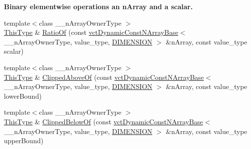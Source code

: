 \begin{Indent}{\bf Binary elementwise operations an n\+Array and a scalar.}
\begin{DoxyCompactItemize}
\item 
{\footnotesize template$<$class \+\_\+\+\_\+n\+Array\+Owner\+Type $>$ }\\\hyperlink{classvct_dynamic_const_n_array_base_a5123caffcf1455a1b99003877eade897}{This\+Type} \& \hyperlink{classvct_dynamic_n_array_base_a7476af6329eb35272605fbe6c8b6dd2d}{Ratio\+Of} (const \hyperlink{classvct_dynamic_const_n_array_base}{vct\+Dynamic\+Const\+N\+Array\+Base}$<$ \+\_\+\+\_\+n\+Array\+Owner\+Type, value\+\_\+type, \hyperlink{classvct_dynamic_n_array_base_aa66532d28588bdf26d08fb593db815d6abfcde386ec801b212d7c42d63a4f3837}{D\+I\+M\+E\+N\+S\+I\+O\+N} $>$ \&n\+Array, const value\+\_\+type scalar)
\item 
{\footnotesize template$<$class \+\_\+\+\_\+n\+Array\+Owner\+Type $>$ }\\\hyperlink{classvct_dynamic_const_n_array_base_a5123caffcf1455a1b99003877eade897}{This\+Type} \& \hyperlink{classvct_dynamic_n_array_base_a0426afa76b231d9774198cbca3cb1c1c}{Clipped\+Above\+Of} (const \hyperlink{classvct_dynamic_const_n_array_base}{vct\+Dynamic\+Const\+N\+Array\+Base}$<$ \+\_\+\+\_\+n\+Array\+Owner\+Type, value\+\_\+type, \hyperlink{classvct_dynamic_n_array_base_aa66532d28588bdf26d08fb593db815d6abfcde386ec801b212d7c42d63a4f3837}{D\+I\+M\+E\+N\+S\+I\+O\+N} $>$ \&n\+Array, const value\+\_\+type lower\+Bound)
\item 
{\footnotesize template$<$class \+\_\+\+\_\+n\+Array\+Owner\+Type $>$ }\\\hyperlink{classvct_dynamic_const_n_array_base_a5123caffcf1455a1b99003877eade897}{This\+Type} \& \hyperlink{classvct_dynamic_n_array_base_a94a4b746a3263b7ad1539f94f50ab0c9}{Clipped\+Below\+Of} (const \hyperlink{classvct_dynamic_const_n_array_base}{vct\+Dynamic\+Const\+N\+Array\+Base}$<$ \+\_\+\+\_\+n\+Array\+Owner\+Type, value\+\_\+type, \hyperlink{classvct_dynamic_n_array_base_aa66532d28588bdf26d08fb593db815d6abfcde386ec801b212d7c42d63a4f3837}{D\+I\+M\+E\+N\+S\+I\+O\+N} $>$ \&n\+Array, const value\+\_\+type upper\+Bound)
\end{DoxyCompactItemize}
\end{Indent}

